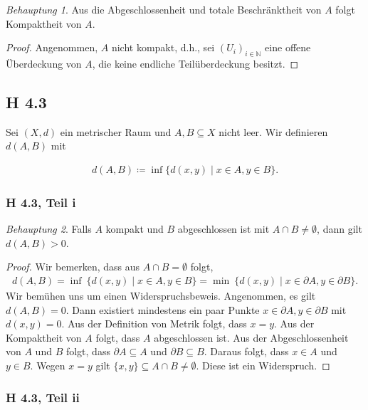 \documentclass[draft,a5paper]{article}
\theoremstyle{remark}
\newtheorem*{beh}{Behauptung}
\begin{document}
\begin{beh}
  Aus die Abgeschlossenheit und totale Beschränktheit von \(A\) folgt
  Kompaktheit von \(A\).
\end{beh}
\begin{proof}
  Angenommen, \(A\) nicht kompakt, d.h., sei
  \((U_{i})_{i \in \mathbb{N}}\) eine offene Überdeckung von \(A\), die keine
  endliche Teilüberdeckung besitzt.
\end{proof}

\subsection*{H 4.3}

Sei \((X, d)\) ein metrischer Raum und \(A, B \subseteq X\) nicht leer.  Wir
definieren \(d(A, B)\) mit

\begin{align*}
  d(A, B) \coloneq \inf \{d(x, y) \mid x \in A, y \in B \}.
\end{align*}

\subsubsection*{H 4.3, Teil i}

\begin{beh}
  Falls \(A\) kompakt und \(B\) abgeschlossen ist mit \(A \cap B \ne \emptyset\),
  dann gilt \(d(A, B) > 0\).
\end{beh}

\begin{proof}
  Wir bemerken, dass aus \(A \cap B = \emptyset\) folgt,
  \begin{align*}
    d(A, B) =
    \inf~\{d(x, y) \mid
    x \in A, y \in B\} = \min~\{d(x, y) \mid x \in \partial A, y \in \partial B\}.
  \end{align*}
  Wir bemühen uns um einen Widerspruchsbeweis.  Angenommen, es gilt
  \(d(A, B) = 0\).  Dann existiert mindestens ein paar Punkte
  \(x \in \partial A, y \in \partial B\) mit \(d(x, y) = 0\).  Aus der Definition von
  Metrik folgt, dass \(x = y\).  Aus der Kompaktheit von \(A\) folgt,
  dass \(A\) abgeschlossen ist.  Aus der Abgeschlossenheit von \(A\)
  und \(B\) folgt, dass \(\partial A \subseteq A\) und
  \(\partial B \subseteq B\).  Daraus folgt, dass \(x \in A\) und
  \(y \in B\).  Wegen \(x = y\) gilt
  \(\{x, y\} \subseteq A \cap B \ne \emptyset\).  Diese ist ein Widerspruch.
\end{proof}


\subsubsection*{H 4.3, Teil ii}
\end{document}
